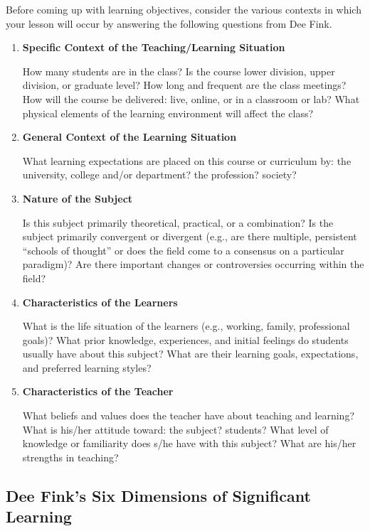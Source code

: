 \documentclass{book}
\begin{document}
Before coming up with learning objectives, consider the various contexts in which
your lesson will occur by answering the following questions from Dee Fink.

\begin{enumerate}
	\item \textbf{Specific Context of the Teaching/Learning Situation}

How many students are in the class? Is the course lower division, upper division, or
graduate level? How long and frequent are the class meetings? How will the course be
delivered: live, online, or in a classroom or lab? What physical elements of the learning
environment will affect the class?

\item \textbf{General Context of the Learning Situation}

What learning expectations are placed on this course or curriculum by: the university,
college and/or department? the profession? society?

\item \textbf{Nature of the Subject}

Is this subject primarily theoretical, practical, or a combination? Is the subject primarily
convergent or divergent (e.g., are there multiple, persistent ``schools of thought'' or does the field
come to a consensus on a particular paradigm)? Are there important changes or controversies occurring within the
field?

\item \textbf{Characteristics of the Learners}

What is the life situation of the learners (e.g., working, family, professional goals)? What
prior knowledge, experiences, and initial feelings do students usually have about this
subject? What are their learning goals, expectations, and preferred learning styles?

\item \textbf{Characteristics of the Teacher}

What beliefs and values does the teacher have about teaching and learning? What is
his/her attitude toward: the subject? students? What level of knowledge or familiarity does
s/he have with this subject? What are his/her strengths in teaching?
\end{enumerate}

\subsection*{Dee Fink's Six Dimensions of Significant Learning}
\end{document}
